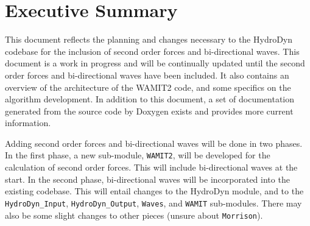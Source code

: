 \chapter*{Executive Summary}
This document reflects the planning and changes necessary to the HydroDyn codebase for the inclusion of second order forces and bi-directional waves. This document is a work in progress and will be continually updated until the second order forces and bi-directional waves have been included.  It also contains an overview of the architecture of the WAMIT2 code, and some specifics on the algorithm development.  In addition to this document, a set of documentation generated from the source code by Doxygen exists and provides more current information.   %

Adding second order forces and bi-directional waves will be done in two phases. In the first phase, a new sub-module, {\tt WAMIT2}, will be developed for the calculation of second order forces. This will include bi-directional waves at the start. In the second phase, bi-directional waves will be incorporated into the existing \HD codebase. This will entail changes to the HydroDyn module, and to the {\tt HydroDyn\_Input}, {\tt HydroDyn\_Output}, {\tt Waves}, and {\tt WAMIT} sub-modules. There may also be some slight changes to other pieces (unsure about {\tt Morrison}).


